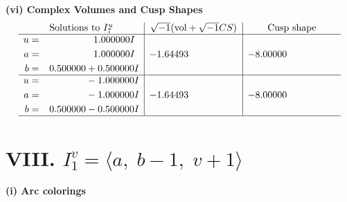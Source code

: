 \documentclass[1p]{elsarticle_modified}
\theoremstyle{definition}
\newcommand{\I}{\sqrt{-1}}
\begin{document}
\newpage\flushleft \textbf{(vi) Complex Volumes and Cusp Shapes}
$$\begin{array}{c|c|c}  
\text{Solutions to }I^u_{7}& \I (\text{vol} + \sqrt{-1}CS) & \text{Cusp shape}\\
 \hline 
\begin{aligned}
u &= \phantom{-0.000000 -}1.000000 I \\
a &= \phantom{-0.000000 -}1.000000 I \\
b &= \phantom{-}0.500000 + 0.500000 I\end{aligned}
 & -1.64493\phantom{ +0.000000I} & -8.00000\phantom{ +0.000000I} \\ \hline\begin{aligned}
u &= \phantom{-0.000000 } -1.000000 I \\
a &= \phantom{-0.000000 } -1.000000 I \\
b &= \phantom{-}0.500000 - 0.500000 I\end{aligned}
 & -1.64493\phantom{ +0.000000I} & -8.00000\phantom{ +0.000000I}\\
 \hline 
 \end{array}$$\newpage\newpage\renewcommand{\arraystretch}{1}
\centering \section*{VIII. $I^v_{1}= \langle a,\;b-1,\;v+1 \rangle$}
\flushleft \textbf{(i) Arc colorings}\\
\end{document}
